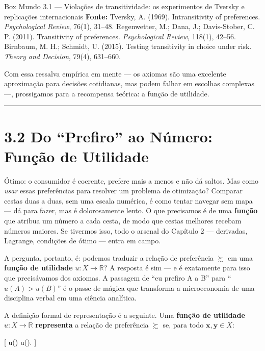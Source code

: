 \documentclass[11pt,twoside,openright]{book}
\begin{document}
\begin{boxmundobox}{Box Mundo 3.1 — Violações de transitividade: os experimentos de Tversky e replicações internacionais}
\textbf{Fonte:} Tversky, A. (1969). Intransitivity of preferences.
\emph{Psychological Review}, 76(1), 31--48. Regenwetter, M.; Dana, J.;
Davis-Stober, C. P. (2011). Transitivity of preferences.
\emph{Psychological Review}, 118(1), 42--56. Birnbaum, M. H.; Schmidt,
U. (2015). Testing transitivity in choice under risk. \emph{Theory and
Decision}, 79(4), 631--660.

\end{boxmundobox}

Com essa ressalva empírica em mente --- os axiomas são uma excelente
aproximação para decisões cotidianas, mas podem falhar em escolhas
complexas ---, prossigamos para a recompensa teórica: a função de
utilidade.

\begin{center}\rule{0.5\linewidth}{0.5pt}\end{center}

\section{3.2 Do ``Prefiro'' ao Número: Função de
Utilidade}\label{do-prefiro-ao-nuxfamero-funuxe7uxe3o-de-utilidade}

Ótimo: o consumidor é coerente, prefere mais a menos e não dá saltos.
Mas como \emph{usar} essas preferências para resolver um problema de
otimização? Comparar cestas duas a duas, sem uma escala numérica, é como
tentar navegar sem mapa --- dá para fazer, mas é dolorosamente lento. O
que precisamos é de uma \textbf{função} que atribua um número a cada
cesta, de modo que cestas melhores recebam números maiores. Se tivermos
isso, todo o arsenal do Capítulo 2 --- derivadas, Lagrange, condições de
ótimo --- entra em campo.

A pergunta, portanto, é: podemos traduzir a relação de preferência
\(\succsim\) em uma \textbf{função de utilidade}
\(u: X \to \mathbb{R}\)? A resposta é sim --- e é exatamente para isso
que precisávamos dos axiomas. A passagem de ``eu prefiro A a B'' para
``\(u(A) > u(B)\)'' é o passe de mágica que transforma a microeconomia
de uma disciplina verbal em uma ciência analítica.

A definição formal de representação é a seguinte. Uma \textbf{função de
utilidade} \(u: X \to \mathbb{R}\) \textbf{representa} a relação de
preferência \(\succsim\) se, para todo \(\mathbf{x}, \mathbf{y} \in X\):

{[}  \succsim {} \iff u()
\geq u(). \label{eq:3.2.1}  {]}
\end{document}

